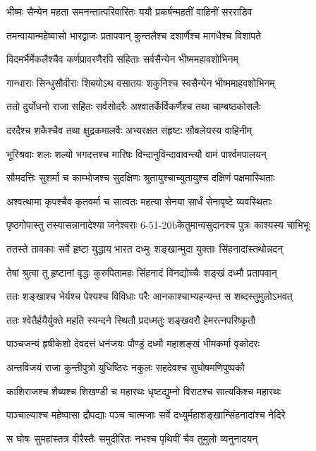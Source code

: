 \twolineshloka
{भीष्मः सैन्येन महता समनन्तात्परिवारितः}
{ययौ प्रकर्षन्महतीं वाहिनीं सरराडिव}


\twolineshloka
{तमन्वायान्महेष्वासो भारद्वाजः प्रतापवान्}
{कुन्तलैश्च दशार्णैश्च मागधैश्च विशांपते}


\twolineshloka
{विदमर्भैर्मेकलैश्चैव कर्णप्रावरणैरपि}
{सहिताः सर्वसैन्येन भीष्ममहावशोभिनम्}


\twolineshloka
{गान्धाराः सिन्धुसौवीराः शिबयोऽथ वसातयः}
{शकुनिश्च स्वसैन्येन भीष्ममाहवशोभिनम्}


\twolineshloka
{ततो दुर्योधनो राजा सहितः सर्वसोदरैः}
{अश्वातर्केर्विकर्णैश्च तथा चाम्बष्ठकोसलैः}


\twolineshloka
{दरदैश्च शकैश्चैव तथा क्षुद्रकमालवैः}
{अभ्यरक्षत संहृष्टः सौबलेयस्य वाहिनीम्}


\twolineshloka
{भूरिश्रवाः शलः शल्यो भगदत्तश्च मारिषः}
{विन्दानुविन्दावावन्त्यौ वामं पार्श्वमपालयन्}


\twolineshloka
{सौमदत्तिः सुशर्मा च काम्भोजश्च सुदक्षिणः}
{श्रुतायुश्चाच्युतायुश्च दक्षिणं पक्षमास्थिताः}


\twolineshloka
{अश्वत्थामा कृपश्चैव कृतवर्मा च सात्वतः}
{महत्या सेनया सार्धं सेनापृष्टे व्यवस्थिताः}


\twolineshloka
{पृष्ठगोपास्तु तस्यासन्नानादेश्या जनेश्वराः}
{6-51-20bकेतुमान्वसुदानश्च पुत्रः काश्यस्य चाभिभूः}


\twolineshloka
{ततस्ते तावकाः सर्वे हृष्टा युद्धाय भारत}
{दध्मुः शङ्खान्मुदा युक्ताः सिंहनादांस्तथोन्नदन्}


\twolineshloka
{तेषां श्रुत्वा तु हृष्टानां वृद्धः कुरुपितामहः}
{सिंहनादं विनद्योच्चैः शङ्खं दध्मौ प्रतापवान्}


\twolineshloka
{ततः शङ्खाश्च भेर्यश्च पेश्यश्च विविधाः परैः}
{आनकाश्चाभ्यहन्यन्त स शब्दस्तुमुलोऽभवत्}


\twolineshloka
{ततः श्वेतैर्हयैर्युक्ते महति स्यन्दने स्थितौ}
{प्रदध्मतुः शङ्खवरौ हेमरत्नपरिष्कृतौ}


\twolineshloka
{पाञ्चजन्यं हृषीकेशो देवदत्तं धनंजयः}
{पौण्ड्रं दध्मौ महाशङ्खं भीमकर्मा वृकोदरः}


\twolineshloka
{अन्तविजयं राजा कुन्तीपुत्रो युधिष्ठिरः}
{नकुलः सहदेवश्च सुघोषमणिपुष्पकौ}


\twolineshloka
{काशिराजश्च शैब्यश्च शिखण्डी च महारथः}
{धृष्टद्युम्नो विराटश्च सात्यकिश्च महारथः}


\twolineshloka
{पाञ्चाल्याश्च महेष्वासा द्रौपद्याः पञ्च चात्मजाः}
{सर्वे दध्युर्महाशङ्खान्सिंहनादांश्च नेदिरे}


\twolineshloka
{स घोषः सुमहांस्तत्र वीरैस्तैः समुदीरितः}
{नभश्च पृथिवीं चैव तुमुलो व्यनुनादयन्}


